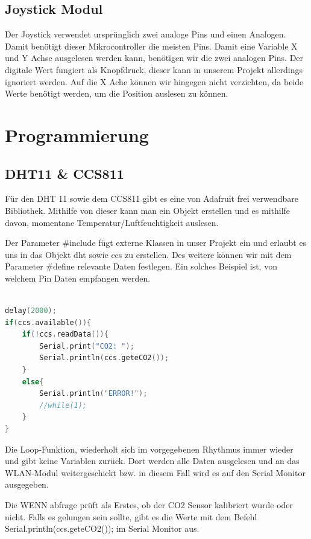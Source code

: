 \subsection{Joystick Modul}

Der Joystick verwendet ursprünglich zwei analoge Pins und einen Analogen. Damit benötigt dieser Mikrocontroller die meisten Pins. Damit eine Variable X und Y Achse ausgelesen werden kann, benötigen wir die zwei analogen Pins. Der digitale Wert fungiert als Knopfdruck, dieser kann in unserem Projekt allerdings ignoriert werden. Auf die X Ache können wir hingegen nicht verzichten, da beide Werte benötigt werden, um die Position auslesen zu können.



\section{Programmierung}

\subsection{DHT11 \& CCS811}

Für den DHT 11 sowie dem CCS811 gibt es eine von Adafruit frei verwendbare Bibliothek. Mithilfe von dieser kann man ein Objekt erstellen und es mithilfe davon, momentane Temperatur/Luftfeuchtigkeit auslesen.



Der Parameter \#include fügt externe Klassen in unser Projekt ein und erlaubt es uns in das Objekt dht sowie ccs zu erstellen.
Des weitere können wir mit dem Parameter \#define relevante Daten festlegen. Ein solches Beispiel ist, von welchem Pin Daten empfangen werden.


\begin{lstlisting}[language=C, caption=Datenauslesung CCS811, label=code:CCS811read]

delay(2000);
if(ccs.available()){
	if(!ccs.readData()){
		Serial.print("CO2: ");
		Serial.println(ccs.geteCO2());
	}
	else{
		Serial.println("ERROR!");
		//while(1);
	}
}
\end{lstlisting}

\cite{CCS811man}


Die Loop-Funktion, wiederholt sich im vorgegebenen Rhythmus immer wieder und gibt keine Variablen zurück. Dort werden alle Daten ausgelesen und an das WLAN-Modul weitergeschickt bzw. in diesem Fall wird es auf den Serial Monitor ausgegeben.

Die WENN abfrage prüft als Erstes, ob der CO2 Sensor kalibriert wurde oder nicht. Falls es gelungen sein sollte, gibt es die Werte mit dem Befehl Serial.println(ccs.geteCO2()); im Serial Monitor aus.

